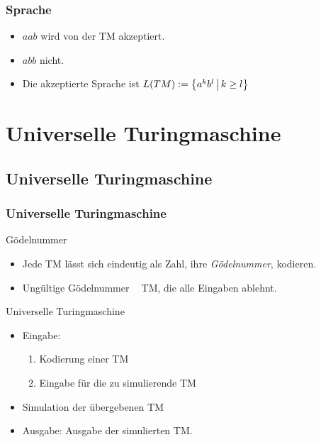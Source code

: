 \begin{frame}
 \frametitle{Sprache}
 \begin{itemize}
  \item $aab$ wird von der TM akzeptiert.
  \item $abb$ nicht.
  \item Die akzeptierte Sprache ist $L(TM) := \left\lbrace a^kb^l \,\middle\vert\, k \geq l \right\rbrace$
 

 \hfill 
 \resizebox{8cm}{!} {%
  \thetm
 }
  \invincible
  \pause
 \ducttape{-6cm} 
  \vincible
 \end{itemize}
 
\end{frame}



\section{Universelle Turingmaschine}
\subsection{Universelle Turingmaschine}
\begin{frame}
\frametitle{Universelle Turingmaschine}
\begin{block}{Gödelnummer}
\begin{itemize}
\item Jede TM lässt sich eindeutig als Zahl, ihre \emph{Gödelnummer}, kodieren.
\item Ungültige Gödelnummer $\mathop{\hat{=}}$ TM, die alle Eingaben ablehnt.
\end{itemize}
\end{block}
\begin{block}{Universelle Turingmaschine}
\begin{itemize}

\item Eingabe:
\begin{enumerate}
\item Kodierung einer TM
\item Eingabe für die zu simulierende TM
\end{enumerate}
\item Simulation der übergebenen TM
\item Ausgabe: Ausgabe der simulierten TM.
\end{itemize}
\end{block}
\end{frame}


